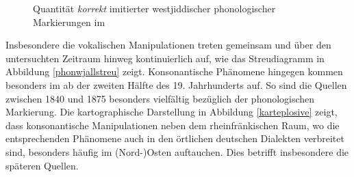{ \begin{figure}[p]
	\caption{Quantität \textit{korrekt} imitierter westjiddischer phonologischer Markierungen im }
	\label{phonwjall}	
\end{figure}

 

Insbesondere die vokalischen Manipulationen treten gemeinsam und über den untersuchten Zeitraum hinweg kontinuierlich auf, wie das Streudiagramm in Abbildung \ref{phonwjallstreu} zeigt. Konsonantische Phänomene hingegen kommen besonders im  ab der zweiten Hälfte des 19. Jahrhunderts auf. So sind die Quellen zwischen 1840 und 1875 besonders vielfältig bezüglich der phonologischen Markierung. Die kartographische Darstellung in Abbildung \ref{karteplosive} zeigt, dass konsonantische Manipulationen neben dem rheinfränkischen Raum, wo die entsprechenden Phänomene auch in den örtlichen deutschen Dialekten verbreitet sind, besonders häufig im (Nord-)Osten auftauchen. Dies betrifft insbesondere die späteren Quellen.

\begin{figure} 
\farbgrafik

	\begin{tikzpicture}


\end{tikzpicture}
\end{figure}}
